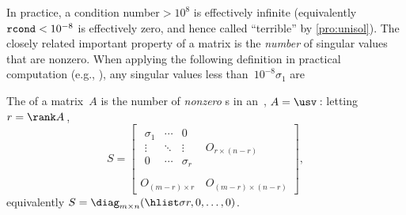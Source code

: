 In practice, a condition number\({}>10^8\) is effectively infinite (equivalently \(\verb|rcond|<10^{-8}\) is effectively zero, and hence called ``terrible'' by \cref{pro:unisol}).
The closely related important property of a matrix is the \emph{number} of singular values that are nonzero.
When applying the following definition in practical computation (e.g., \script), any singular values less than~\(10^{-8}\sigma_1\) are 


\begin{definition} \label{def:rank}
    The  of a matrix~$A$ is the number of \emph{nonzero} s in an~\svd, \(A=\usv\)\,:
    letting \(r=\rank A\)\,,
\begin{equation*}
S=\begin{bmatrix} \begin{matrix} \sigma_1&\cdots&0\\
\vdots&\ddots&\vdots\\
0&\cdots&\sigma_r \end{matrix} & 
O_{r\times (n-r)}\\\,\\
O_{(m-r)\times r}&O_{(m-r)\times (n-r)}\end{bmatrix},
\end{equation*}
equivalently \(S=\diag_{m\times n}(\hlist\sigma r,0,\ldots,0)\).
\end{definition}

